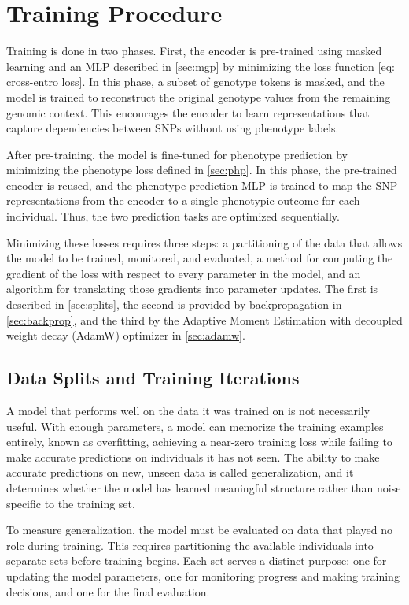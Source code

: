 \section{Training Procedure} \label{sec:training}
Training is done in two phases. First, the encoder is pre-trained using masked learning and an MLP described in \autoref{sec:mgp} by minimizing the loss function \eqref{eq: cross-entro loss}. In this phase, a subset of genotype tokens is masked, and the model is trained to reconstruct the original genotype values from the remaining genomic context. This encourages the encoder to learn representations that capture dependencies between SNPs without using phenotype labels.

After pre-training, the model is fine-tuned for phenotype prediction by minimizing the phenotype loss defined in \autoref{sec:php}. In this phase, the pre-trained encoder is reused, and the phenotype prediction MLP is trained to map the SNP representations from the encoder to a single phenotypic outcome for each individual. Thus, the two prediction tasks are optimized sequentially.

Minimizing these losses requires three steps: a partitioning of the data that allows the model to be trained, monitored, and evaluated, a method for computing the gradient of the loss with respect to every parameter in the model, and an algorithm for translating those gradients into parameter updates. The first is described in \autoref{sec:splits}, the second is provided by backpropagation in \autoref{sec:backprop}, and the third by the Adaptive Moment Estimation with decoupled weight decay (AdamW) optimizer in \autoref{sec:adamw}.

\subsection{Data Splits and Training Iterations} \label{sec:splits}
A model that performs well on the data it was trained on is not necessarily
useful. With enough parameters, a model can memorize the training examples
entirely, known as overfitting, achieving a near-zero training loss while
failing to make accurate predictions on individuals it has not seen. The
ability to make accurate predictions on new, unseen data is called
generalization, and it determines whether the model has learned meaningful
structure rather than noise specific to the training set.

To measure generalization, the model must be evaluated on data that played
no role during training. This requires partitioning the available individuals
into separate sets before training begins. Each set serves a distinct
purpose: one for updating the model parameters, one for monitoring progress
and making training decisions, and one for the final evaluation.

